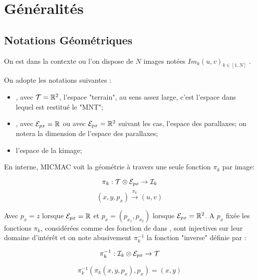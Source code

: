 \chapter{G\'en\'eralit\'es}


\section{Notations G\'eom\'etriques}

On est dans la contexte ou l'on dispose de $N$ images 
not\'ees $Im_k(u,v)_{k\in [1,N]}$ .

On adopte les notations suivantes :

\begin{itemize}
   \item \ETer,  avec  $\ETer = \RR ^2$, l'espace "terrain", au sens assez large, 
         c'est l'espace dans lequel est restitu\'e le "MNT"; 

   \item \EPx, avec  $\EPx = \RR$ ou avec  $\EPx = \RR ^2$ suivant les cas, 
         l'espace des parallaxes; on notera \DimPx la dimension de l'espace
         des parallaxes;

   \item \EIm l'espace de la k\EME image;
\end{itemize}

En interne, MICMAC voit la g\'eom\'etrie  \`a travers une seule
fonction $\pi_k$ par image:

\begin{equation}
   \pi_k :   \ETer \otimes \EPx \rightarrow \EIm
\end{equation}
\begin{equation}
              (x,y,p_x)  \stackrel{\pi_k}{\rightarrow}  (u,v)
\end{equation}

Avec $p_x=z$ lorsque $\EPx = \RR$ et   $p_x=(p_{x_1},p_{x_2})$ 
lorsque $\EPx = \RR^2$. A  $p_x$ fix\'ee les fonctions $\pi_k$,
 consid\'er\'ees comme des fonction de \ETer dans  \EIm, 
sont injectives sur leur domaine d'int\'er\^et et on note
abusivement  $\pi_k^{-1}$ la fonction "inverse" d\'efinie par  :

\begin{equation}
   \pi_k^{-1} :   \EIm \otimes \EPx \rightarrow \ETer
\end{equation}

\begin{equation}
   \pi_k^{-1}(\pi_k(x,y,p_x),p_x) = (x,y) 
\end{equation}


